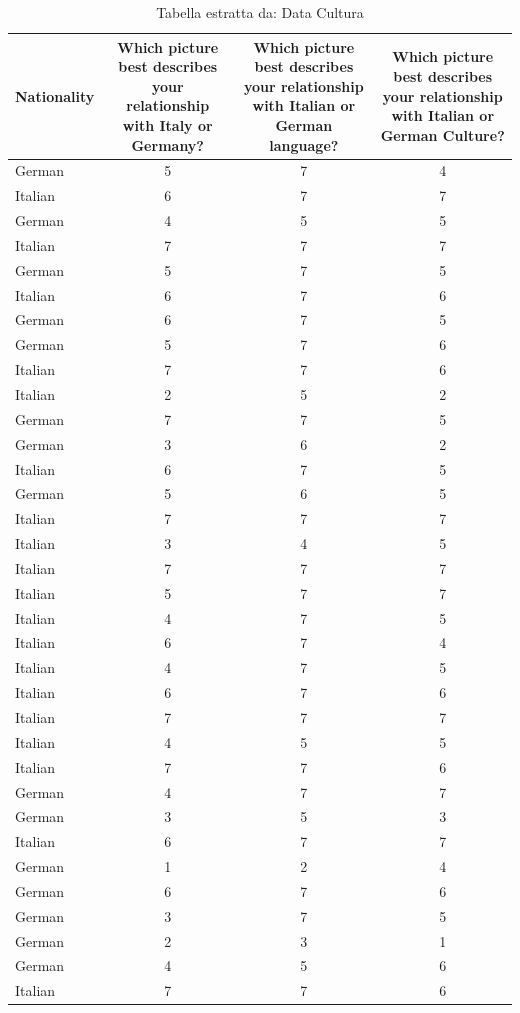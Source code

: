 \begin{table}[htbp]
\caption{Tabella estratta da: Data Cultura}
\label{tab:data_cultura}
\begin{tabular}{lccc}
\toprule
Nationality & Which picture best describes your relationship with Italy or Germany? & Which picture best describes your relationship with Italian or German language? & Which picture best describes your relationship with Italian or German Culture? \\
\midrule
German & 5 & 7 & 4 \\
Italian & 6 & 7 & 7 \\
German & 4 & 5 & 5 \\
Italian & 7 & 7 & 7 \\
German & 5 & 7 & 5 \\
Italian & 6 & 7 & 6 \\
German & 6 & 7 & 5 \\
German & 5 & 7 & 6 \\
Italian & 7 & 7 & 6 \\
Italian & 2 & 5 & 2 \\
German & 7 & 7 & 5 \\
German & 3 & 6 & 2 \\
Italian & 6 & 7 & 5 \\
German & 5 & 6 & 5 \\
Italian & 7 & 7 & 7 \\
Italian & 3 & 4 & 5 \\
Italian & 7 & 7 & 7 \\
Italian & 5 & 7 & 7 \\
Italian & 4 & 7 & 5 \\
Italian & 6 & 7 & 4 \\
Italian & 4 & 7 & 5 \\
Italian & 6 & 7 & 6 \\
Italian & 7 & 7 & 7 \\
Italian & 4 & 5 & 5 \\
Italian & 7 & 7 & 6 \\
German & 4 & 7 & 7 \\
German & 3 & 5 & 3 \\
Italian & 6 & 7 & 7 \\
German & 1 & 2 & 4 \\
German & 6 & 7 & 6 \\
German & 3 & 7 & 5 \\
German & 2 & 3 & 1 \\
German & 4 & 5 & 6 \\
Italian & 7 & 7 & 6 \\

\end{tabular}
\end{table}
